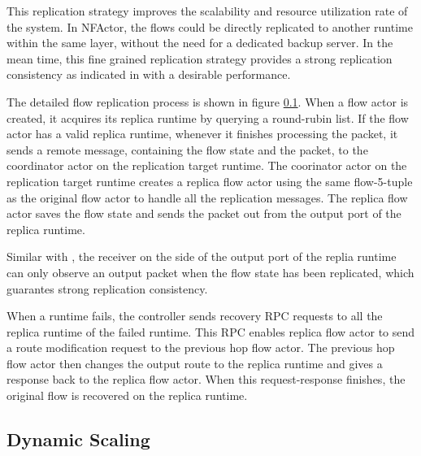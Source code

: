This replication strategy improves the scalability and resource utilization rate of the system. In NFActor, the flows could be directly replicated to another runtime within the same layer, without the need for a dedicated backup server. In the mean time, this fine grained replication strategy provides a strong replication consistency as indicated in \cite{sherry2015rollback} with a desirable performance.


The detailed flow replication process is shown in figure \ref{}. When a flow actor is created, it acquires its replica runtime by querying a round-rubin list. If the flow actor has a valid replica runtime, whenever it finishes processing the packet, it sends a remote message, containing the flow state and the packet, to the coordinator actor on the replication target runtime. The coorinator actor on the replication target runtime creates a replica flow actor using the same flow-5-tuple as the original flow actor to handle all the replication messages. The replica flow actor saves the flow state and sends the packet out from the output port of the replica runtime.

Similar with \cite{sherry2015rollback}, the receiver on the side of the output port of the replia runtime can only observe an output packet when the flow state has been replicated, which guarantes strong replication consistency.


When a runtime fails, the controller sends recovery RPC requests to all the replica runtime of the failed runtime. This RPC enables replica flow actor to send a route modification request to the previous hop flow actor. The previous hop flow actor then changes the output route to the replica runtime and gives a response back to the replica flow actor. When this request-response finishes, the original flow is recovered on the replica runtime.

\subsection{Dynamic Scaling}
